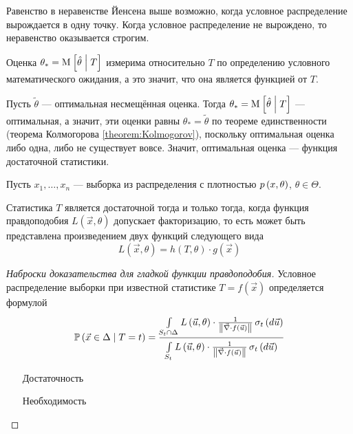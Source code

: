 \begin{remark}
    Равенство в неравенстве Йенсена выше возможно,
    когда условное распределение вырождается в одну точку.
    Когда условное распределение не вырождено,
    то неравенство оказывается строгим.
\end{remark}

\begin{remark}
    Оценка $\theta_* = \Mean{\hat{\theta} \mcond T}$ измерима относительно $T$
    по определению условного математического ожидания, а это значит,
    что она является функцией от $T$.

    Пусть $\tilde{\theta}$ --- оптимальная несмещённая оценка.
    Тогда $\theta_* = \Mean{\hat{\theta} \mcond T}$ --- оптимальная, а значит,
    эти оценки равны $\theta_* = \tilde{\theta}$ по теореме единственности
    (теорема Колмогорова \ref{theorem:Kolmogorov}),
    поскольку оптимальная оценка либо одна, либо не существует вовсе.
    Значит, оптимальная оценка --- функция достаточной статистики.
\end{remark}

\begin{theorem}
    Пусть $x_1, \dots, x_n$ --- выборка из распределения
    с плотностью $\pdf{x,\theta}$, $\theta \in \Theta$.

    Статистика $T$ является достаточной тогда и только тогда, когда
    функция правдоподобия $L\left( \vec{x}, \theta \right)$
    допускает факторизацию, то есть может быть представлена
    произведением двух функций следующего вида
    $$L\left( \vec{x}, \theta \right)
        = h\left( T, \theta \right) \cdot g\left( \vec{x} \right)$$
\end{theorem}

\begin{proof}[Наброски доказательства для гладкой функции правдоподобия]
    Условное распределение выборки при известной статистике
    $T=f\left( \vec{x} \right)$ определяется формулой
    $$\probability{\vec{x} \in \Delta \mcond T = t}
        = \frac{\integrall{S_t \cap \Delta}{\sigma_{t}\left(d\vec{u} \right)}{
            L\left( \vec{u}, \theta \right) \cdot \frac{1}{
                \left\| \vec{\nabla} \cdot f\left( \vec{u} \right) \right\|}}}
            {\integrall{S_t}{\sigma_{t}\left(d\vec{u} \right)}{
                L\left( \vec{u}, \theta \right) \cdot \frac{1}{
                    \left\| \vec{\nabla}
                        \cdot f\left( \vec{u} \right) \right\|}}}$$
    \begin{enumerate}
        \item[Достаточность]

        \item[Необходимость]
    \end{enumerate}
\end{proof}
